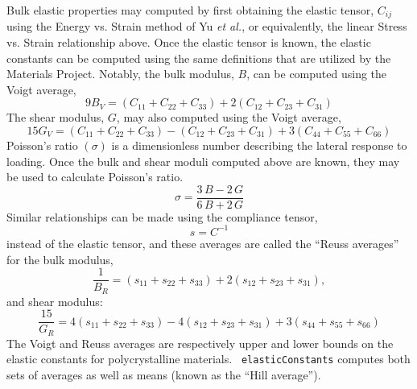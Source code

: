 \documentclass[letterpaper]{report}
\begin{document}
Bulk elastic properties may computed by first obtaining the elastic
tensor, $C_{ij}$ using the Energy vs. Strain method of Yu \textit{et
  al.},\cite{Yu:2010qm,Golesorkhtabar:2013cr} or equivalently, the
linear Stress vs. Strain relationship above. Once the elastic tensor
is known, the elastic constants can be computed using the same
definitions that are utilized by the Materials
Project.\cite{Jong:2015bs,Gaillac:2016eu} Notably, the bulk modulus,
$B$, can be computed using the Voigt average,\cite{Jong:2015bs}
\begin{equation}
    9 B_V =\left(C_{11}+C_{22}+C_{33}\right) +2\left(C_{12}+C_{23}+C_{31}\right)
\label{eq:BM}
\end{equation}
The shear modulus, $G$, may also computed using the Voigt average,
\begin{equation}
    15 G_V =\left(C_{11}+C_{22}+C_{33}\right) - \left(C_{12}+C_{23} + C_{31}\right) +3\left(C_{44}+C_{55}+C_{66}\right) 
\label{eq:SM}
\end{equation}
Poisson's ratio $(\sigma)$ is a dimensionless number describing the
lateral response to loading. Once the bulk and shear moduli computed
above are known, they may be used to calculate Poisson's ratio.
\begin{equation}
\sigma = \frac{3\,B - 2\,G}{6\,B+2\,G}    
\end{equation}
Similar relationships can be made using the compliance tensor,
\begin{equation}
  s = C^{-1}
\end{equation}
instead of the elastic tensor, and these averages are called the
``Reuss averages'' for the bulk modulus,
\begin{equation}
    \frac{1}{B_R} =\left(s_{11}+s_{22}+s_{33}\right) +2\left(s_{12}+s_{23}+s_{31}\right),
\label{eq:BMR}
\end{equation}
and shear modulus:
\begin{equation}
    \frac{15}{G_R} =4 \left(s_{11}+s_{22}+s_{33}\right) -
    4\left(s_{12}+s_{23} + s_{31}\right) +3 \left(s_{44}+s_{55}+s_{66}\right) 
\label{eq:SMr}
\end{equation}
The Voigt and Reuss averages are respectively upper and lower bounds
on the elastic constants for polycrystalline materials.   {\tt
  elasticConstants} computes both sets of averages as well as means
(known as the ``Hill average'').  
\end{document}
